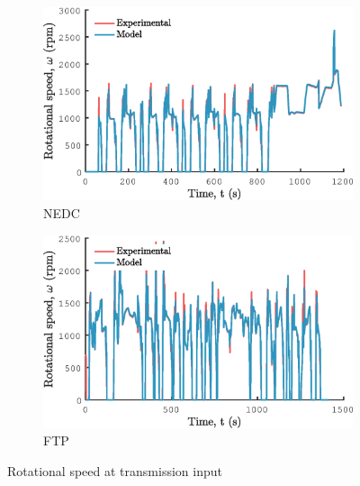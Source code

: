 \begin{figure}[ht]
  \centering
  \begin{subfigure}[b]{0.49\textwidth}
    \includegraphics[width=\textwidth]{figures/model/NEDC/w_trans_in.eps}
    \caption{NEDC}
    \label{fig:NEDC_w_trans_in}
  \end{subfigure}
  \begin{subfigure}[b]{0.49\textwidth}
    \includegraphics[width=\textwidth]{figures/model/FTP/w_trans_in.eps}
    \caption{FTP}
    \label{fig:FTP_w_trans_in}
  \end{subfigure}
  \caption{Rotational speed at transmission input}\label{fig:w_trans_in}
\end{figure}


